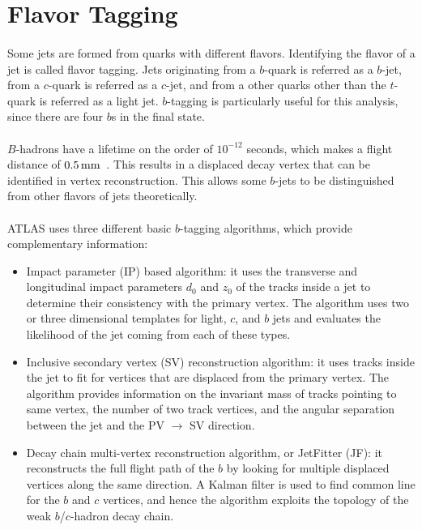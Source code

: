 \section{Flavor Tagging}
\label{sec:btag_70wp}
\paragraph{}
Some jets are formed from quarks with different flavors. 
Identifying the flavor of a jet is called flavor tagging. 
Jets originating from a $b$-quark is referred as a $b$-jet, from a $c$-quark is referred as a $c$-jet, and from a other quarks other than the $t$-quark is referred as a light jet.
$b$-tagging is particularly useful for this analysis, since there are four $b$s in the final state.

\paragraph{}
$B$-hadrons have a lifetime on the order of $10^{-12}$ seconds, which makes a flight distance of $0.5\,\rm mm$~\cite{Pdg}. 
This results in a displaced decay vertex that can be identified in vertex reconstruction. 
This allows some $b$-jets to be distinguished from other flavors of jets theoretically.

\paragraph{}
ATLAS uses three different basic $b$-tagging algorithms, which provide complementary information:
\begin{itemize}
	\item Impact parameter (IP) based algorithm: it uses the transverse and longitudinal impact parameters $d_0$ and $z_0$ of the tracks inside a jet to determine their consistency with the primary vertex. The algorithm uses two or three dimensional templates for light, $c$, and $b$ jets and evaluates the likelihood of the jet coming from each of these types.

	\item Inclusive secondary vertex (SV) reconstruction algorithm: it uses tracks inside the jet to fit for vertices that are displaced from the primary vertex. The algorithm provides information on the invariant mass of tracks pointing to same vertex, the number of two track vertices, and the angular separation between the jet and the PV $\to$ SV direction.

	\item Decay chain multi-vertex reconstruction algorithm, or JetFitter (JF): it reconstructs the full flight path of the $b$ by looking for multiple displaced vertices along the same direction. A Kalman filter is used to find common line for the $b$ and $c$ vertices, and hence the algorithm exploits the topology of the weak $b$/$c$-hadron decay chain.
\end{itemize}
 
